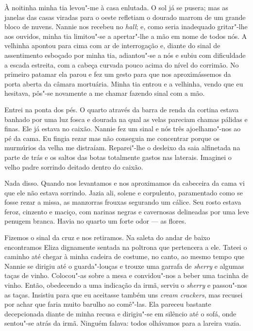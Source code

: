 À noitinha minha tia levou"-me à casa enlutada.  O sol já se pusera; mas as
janelas das casas viradas para o oeste refletiam o dourado marrom de um grande
bloco de nuvens.  Nannie nos recebeu no \textit{hall}; e, como seria inadequado
gritar"-lhe aos ouvidos, minha tia limitou"-se a apertar"-lhe a mão em nome de
todos nós.  A velhinha apontou para cima com ar de interrogação e, diante do
sinal de assentimento esboçado por minha tia, adiantou"-se a nós e subiu com
dificuldade a escada estreita, com a cabeça curvada pouco acima do nível do
corrimão.  No primeiro patamar ela parou e fez um gesto para que nos
aproximássemos da porta aberta da câmara mortuária.  Minha tia entrou e a
velhinha, vendo que eu hesitava, pôs"-se novamente a me chamar fazendo sinal com
a mão.

Entrei na ponta dos pés.  O quarto através da barra de renda da cortina estava
banhado por uma luz fosca e dourada na qual as velas pareciam chamas pálidas e
finas.  Ele já estava no caixão.  Nannie fez um sinal e nós três ajoelhamo"-nos
ao pé da cama.  Eu fingia rezar mas não conseguia me concentrar porque os
murmúrios da velha me distraíam.  Reparei"-lhe o desleixo da saia alfinetada na
parte de trás e os saltos das botas totalmente gastos nas laterais.  Imaginei o
velho padre sorrindo deitado dentro do caixão.

Nada disso.  Quando nos levantamos e nos aproximamos da cabeceira da cama vi
que ele não estava sorrindo.  Jazia ali, solene e corpulento, paramentado como
se fosse rezar a missa, as manzorras frouxas segurando um cálice.  Seu rosto
estava feroz, cinzento e maciço, com narinas negras e cavernosas delineadas por
uma leve penugem branca.  Havia no quarto um forte odor --- as flores.

Fizemos o sinal da cruz e nos retiramos.  Na saleta do andar de baixo
encontramos Eliza dignamente sentada na poltrona que pertencera a ele.  Tateei
o caminho até chegar à minha cadeira de costume, no canto, ao mesmo tempo que
Nannie se dirigiu até o guarda"-louças e trouxe uma garrafa de \textit{sherry} e
algumas taças de vinho.  Colocou"-as sobre a mesa e convidou"-nos a beber uma
tacinha de vinho.  Então, obedecendo a uma indicação da irmã, serviu o
\textit{sherry} e passou"-nos as taças.  Insistiu para que eu aceitasse também
uns \textit{cream crackers}, mas recusei por achar que faria muito barulho ao
comê"-las.  Ela pareceu bastante decepcionada diante de minha recusa e
dirigiu"-se em silêncio até o sofá, onde sentou"-se atrás da irmã.  Ninguém
falava: todos olhávamos para a lareira vazia.

